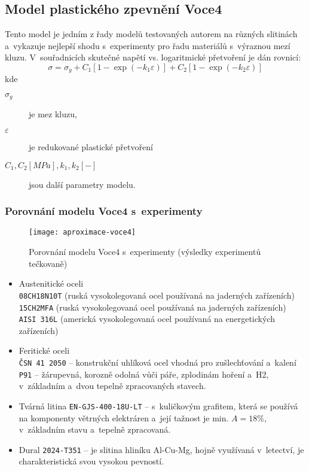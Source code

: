 
\subsection{Model plastického zpevnění Voce4}\label{sec:model-voce-4}
Tento model je jedním z řady modelů testovaných autorem na různých slitinách a~vykazuje nejlepší shodu s~experimenty pro řadu materiálů s~výraznou mezí kluzu.
V~souřadnicích skutečné napětí vs. logaritmické přetvoření je dán rovnicí:
\begin{equation}
	\sigma = \sigma_y + C_1 \left[ 1 - \exp\left(-k_1 \varepsilon\right) \right] + C_2 \left[ 1 - \exp\left(-k_2 \varepsilon\right) \right]
\end{equation}
kde
\begin{description}
	\item[$\sigma_y$]je mez kluzu,
	\item[$\varepsilon$] je redukované plastické přetvoření
	\item[{$C_1, C_2  [MPa], k_1, k_2 [-]$}] jsou další parametry modelu.
\end{description}

\subsubsection{Porovnání modelu Voce4 s~experimenty}
\begin{figure}[H]
	\centering
	\texttt{[image: aproximace-voce4]}
	\caption{Porovnání modelu Voce4 s~experimenty (výsledky experimentů tečkovaně)}
	\label{fig:aproximace-voce4}
\end{figure}

\begin{itemize}
	\item Austenitické oceli\\
	\texttt{08CH18N10T} (ruská vysokolegovaná ocel používaná na jaderných zařízeních)\\
	\texttt{15CH2MFA} (ruská vysokolegovaná ocel používaná na jaderných zařízeních)\\
	\texttt{AISI 316L} (americká vysokolegovaná ocel používaná na energetických zařízeních)
	\item Feritické oceli\\
	\texttt{ČSN 41 2050} -- konstrukční uhlíková ocel vhodná pro zušlechťování a~kalení\\
	\texttt{P91} -- žárupevná, korozně odolná vůči páře, zplodinám hoření a~H2, v~základním a~dvou tepelně zpracovaných stavech.
	\item Tvárná litina \texttt{EN-GJS-400-18U-LT} -- s kuličkovým grafitem, která se používá na komponenty větrných elektráren a~její tažnost je min. $A=18\%$, v~základním stavu a~tepelně zpracovaná.
	\item Dural \texttt{2024-T351} -- je slitina hliníku Al-Cu-Mg, hojně využívaná v~letectví, je charakteristická svou vysokou pevností.
\end{itemize}
